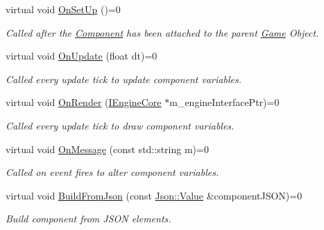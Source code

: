 \begin{DoxyCompactItemize}
\item 
\hypertarget{class_component_a27f86131a87b858143069631fade78fb}{virtual void \hyperlink{class_component_a27f86131a87b858143069631fade78fb}{On\+Set\+Up} ()=0}\label{class_component_a27f86131a87b858143069631fade78fb}

\begin{DoxyCompactList}\small\item\em Called after the \hyperlink{class_component}{Component} has been attached to the parent \hyperlink{class_game}{Game} Object. \end{DoxyCompactList}\item 
\hypertarget{class_component_ab71d7f4b6d8792287a9b0c9e045acbe0}{virtual void \hyperlink{class_component_ab71d7f4b6d8792287a9b0c9e045acbe0}{On\+Update} (float dt)=0}\label{class_component_ab71d7f4b6d8792287a9b0c9e045acbe0}

\begin{DoxyCompactList}\small\item\em Called every update tick to update component variables. \end{DoxyCompactList}\item 
\hypertarget{class_component_aa9f90c2587b0c1182d804f4e256d97df}{virtual void \hyperlink{class_component_aa9f90c2587b0c1182d804f4e256d97df}{On\+Render} (\hyperlink{class_i_engine_core}{I\+Engine\+Core} $\ast$m\+\_\+engine\+Interface\+Ptr)=0}\label{class_component_aa9f90c2587b0c1182d804f4e256d97df}

\begin{DoxyCompactList}\small\item\em Called every update tick to draw component variables. \end{DoxyCompactList}\item 
\hypertarget{class_component_a1a880fe5e212cd7ef8241e220660417d}{virtual void \hyperlink{class_component_a1a880fe5e212cd7ef8241e220660417d}{On\+Message} (const std\+::string m)=0}\label{class_component_a1a880fe5e212cd7ef8241e220660417d}

\begin{DoxyCompactList}\small\item\em Called on event fires to alter component variables. \end{DoxyCompactList}\item 
\hypertarget{class_component_acd902c5b6b2f3e991966a3ec9c5196b0}{virtual void \hyperlink{class_component_acd902c5b6b2f3e991966a3ec9c5196b0}{Build\+From\+Json} (const \hyperlink{class_json_1_1_value}{Json\+::\+Value} \&component\+J\+S\+O\+N)=0}\label{class_component_acd902c5b6b2f3e991966a3ec9c5196b0}

\begin{DoxyCompactList}\small\item\em Build component from J\+S\+O\+N elements. \end{DoxyCompactList}\end{DoxyCompactItemize}
